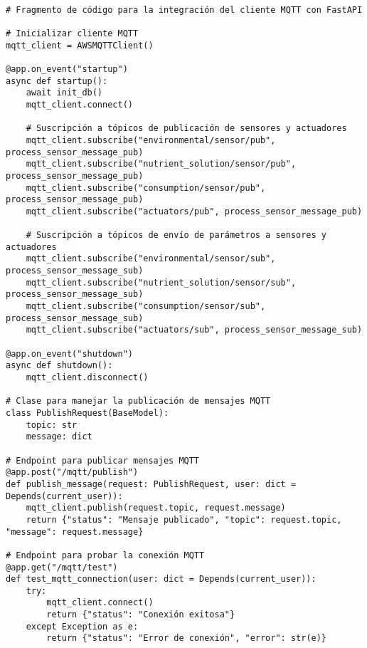 \begin{lstlisting}[label=cod:integracion_fastapi,caption=Cliente MQTT en FastAPI., language=PythonUTF8]

# Fragmento de código para la integración del cliente MQTT con FastAPI

# Inicializar cliente MQTT
mqtt_client = AWSMQTTClient()

@app.on_event("startup")
async def startup():
    await init_db()
    mqtt_client.connect()
         
    # Suscripción a tópicos de publicación de sensores y actuadores
    mqtt_client.subscribe("environmental/sensor/pub", process_sensor_message_pub)
    mqtt_client.subscribe("nutrient_solution/sensor/pub", process_sensor_message_pub)
    mqtt_client.subscribe("consumption/sensor/pub", process_sensor_message_pub)
    mqtt_client.subscribe("actuators/pub", process_sensor_message_pub)

    # Suscripción a tópicos de envío de parámetros a sensores y actuadores
    mqtt_client.subscribe("environmental/sensor/sub", process_sensor_message_sub)
    mqtt_client.subscribe("nutrient_solution/sensor/sub", process_sensor_message_sub)
    mqtt_client.subscribe("consumption/sensor/sub", process_sensor_message_sub)
    mqtt_client.subscribe("actuators/sub", process_sensor_message_sub)

@app.on_event("shutdown")
async def shutdown():
    mqtt_client.disconnect()

# Clase para manejar la publicación de mensajes MQTT
class PublishRequest(BaseModel):
    topic: str
    message: dict
    
# Endpoint para publicar mensajes MQTT
@app.post("/mqtt/publish")
def publish_message(request: PublishRequest, user: dict = Depends(current_user)):
    mqtt_client.publish(request.topic, request.message)
    return {"status": "Mensaje publicado", "topic": request.topic, "message": request.message}
    
# Endpoint para probar la conexión MQTT
@app.get("/mqtt/test")
def test_mqtt_connection(user: dict = Depends(current_user)):
    try:
        mqtt_client.connect()
        return {"status": "Conexión exitosa"}
    except Exception as e:
        return {"status": "Error de conexión", "error": str(e)}
\end{lstlisting}

